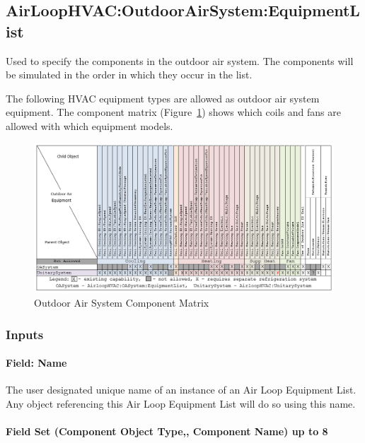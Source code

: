 \subsection{AirLoopHVAC:OutdoorAirSystem:EquipmentList}\label{airloophvacoutdoorairsystemequipmentlist}

Used to specify the components in the outdoor air system. The components will be simulated in the order in which they occur in the list.

The following HVAC equipment types are allowed as outdoor air system equipment. The component matrix (Figure~\ref{fig:outdoor-air-system-component-matrix}) shows which coils and fans are allowed with which equipment models.

\begin{figure}[htbp]
\centering
\includegraphics{media/OASysComponentMatrix.png}
\caption{Outdoor Air System Component Matrix \protect \label{fig:outdoor-air-system-component-matrix}}
\end{figure}

\subsubsection{Inputs}\label{inputs-4-001}

\paragraph{Field: Name}\label{field-name-4-001}

The user designated unique name of an instance of an Air Loop Equipment List. Any object referencing this Air Loop Equipment List will do so using this name.

\paragraph{Field Set (Component Object Type,, Component Name) up to 8}\label{field-set-component-object-type-component-name-up-to-8}

